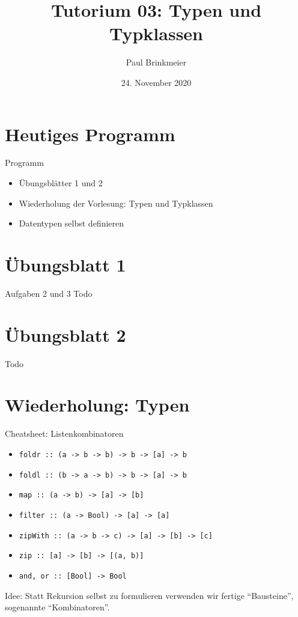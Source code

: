 \documentclass{beamer}
\title{Tutorium 03: Typen und Typklassen}
\author{Paul Brinkmeier}
\institute{Tutorium Programmierparadigmen am KIT}
\date{24. November 2020}
\begin{document}
\begin{frame}
	\titlepage
\end{frame}

\section{Heutiges Programm}
\begin{frame}{Programm}
	\begin{itemize}
                \item Übungsblätter 1 und 2
		\item Wiederholung der Vorlesung: Typen und Typklassen
		\item Datentypen selbst definieren
	\end{itemize}
\end{frame}

\section{Übungsblatt 1}

\begin{frame}{Aufgaben 2 und 3}
  Todo
\end{frame}

\section{Übungsblatt 2}

\begin{frame}
  Todo
\end{frame}

\section{Wiederholung: Typen}

\begin{frame}{Cheatsheet: Listenkombinatoren}
  \begin{itemize}
    \item \texttt{foldr :: (a -> b -> b) -> b -> [a] -> b}
    \item \texttt{foldl :: (b -> a -> b) -> b -> [a] -> b}
    \item \texttt{map :: (a -> b) -> [a] -> [b]}
    \item \texttt{filter :: (a -> Bool) -> [a] -> [a]}
    \item \texttt{zipWith :: (a -> b -> c) -> [a] -> [b] -> [c]}
    \item \texttt{zip :: [a] -> [b] -> [(a, b)]}
    \item \texttt{and, or :: [Bool] -> Bool}
  \end{itemize}

  Idee: Statt Rekursion selbst zu formulieren verwenden wir fertige \enquote{Bausteine}, sogenannte \enquote{Kombinatoren}.
\end{frame}
\end{document}
